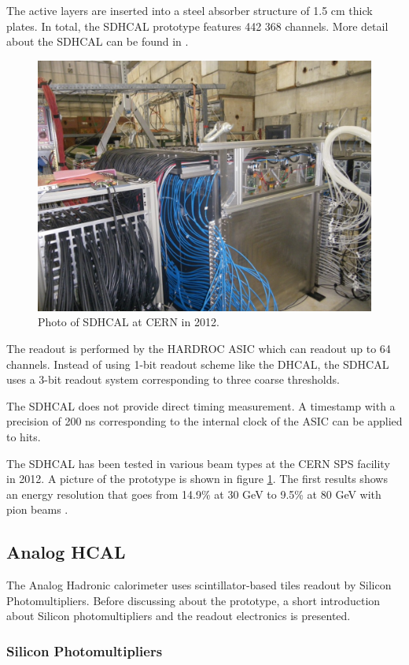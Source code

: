 The active layers are inserted into a steel absorber structure of 1.5 cm thick plates. In total, the SDHCAL prototype features 442 368 channels. More detail about the SDHCAL can be found in \cite{1748-0221-10-10-P10039}.

\begin{figure}[htbp!]
  \centering
  \includegraphics[width=0.7\linewidth]{chap3/fig/SDHCAL.jpg}
  \caption{Photo of SDHCAL at CERN in 2012.} \label{fig:SDHCAL}
\end{figure}

The readout is performed by the HARDROC ASIC \cite{HARDROC:IEEE} which can readout up to 64 channels. Instead of using 1-bit readout scheme like the DHCAL, the SDHCAL uses a 3-bit readout system corresponding to three coarse thresholds.

The SDHCAL does not provide direct timing measurement. A timestamp with a precision of 200 ns corresponding to the internal clock of the ASIC can be applied to hits.

The SDHCAL has been tested in various beam types at the CERN SPS facility in 2012. A picture of the prototype is shown in figure \ref{fig:SDHCAL}. The first results shows an energy resolution that goes from 14.9\% at 30 GeV to 9.5\% at 80 GeV with pion beams \cite{Buridon:2016ill}.

\subsection{Analog HCAL}
\label{sec:AHCAL}

The Analog Hadronic calorimeter uses scintillator-based tiles readout by Silicon Photomultipliers. Before discussing about the prototype, a short introduction about Silicon photomultipliers and the readout electronics is presented.

\subsubsection{Silicon Photomultipliers}
\label{sec:SiPM}

